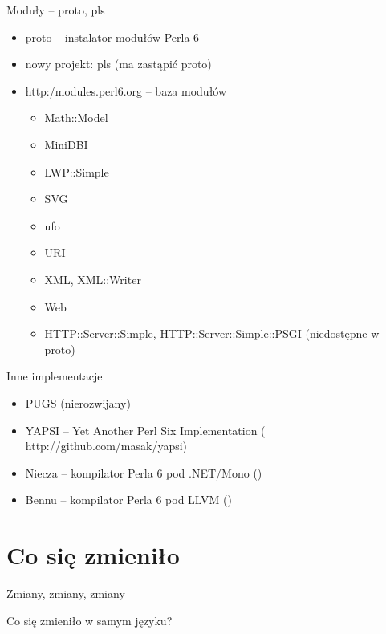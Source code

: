 \documentclass{beamer}
\begin{document}
\begin{frame}{Moduły -- proto, pls}
	\begin{itemize}
		\item proto -- instalator modułów Perla 6
		\item nowy projekt: pls (ma zastąpić proto)
		\item {}
			{http:/modules.perl6.org} -- baza modułów
		\begin{itemize}
			\item Math::Model
			\item MiniDBI
			\item LWP::Simple
			\item SVG
			\item ufo
			\item URI
			\item XML, XML::Writer
			\item Web
			\item HTTP::Server::Simple, HTTP::Server::Simple::PSGI (niedostępne w proto)
		\end{itemize}
	\end{itemize}
\end{frame}

\begin{frame}{Inne implementacje}
	\begin{itemize}
		\item PUGS (nierozwijany)
		\item YAPSI -- Yet Another Perl Six Implementation
			(
			{http://github.com/masak/yapsi})
		\item Niecza -- kompilator Perla 6 pod .NET/Mono ()
		\item Bennu -- kompilator Perla 6 pod LLVM ()
	\end{itemize}
\end{frame}
			\section{Co się zmieniło}

\begin{frame}{Zmiany, zmiany, zmiany}
	\begin{center}
	{\huge Co się zmieniło w samym języku?}
	\end{center}
\end{frame}
\end{document}
